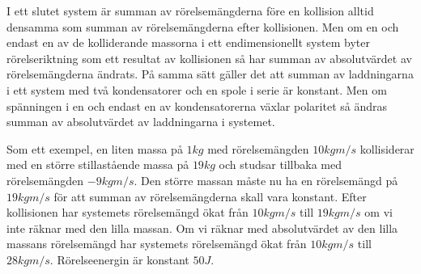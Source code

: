 \documentclass[]{elementary-physics}
\begin{document}
I ett slutet system är summan av rörelsemängderna före en kollision alltid densamma som summan av rörelsemängderna efter kollisionen.
Men om en och endast en av de kolliderande massorna i ett endimensionellt system byter rörelseriktning som ett resultat av kollisionen så har summan av absolutvärdet av rörelsemängderna ändrats.
På samma sätt gäller det att summan av laddningarna i ett  system med två kondensatorer och en spole i serie är konstant.
Men om spänningen i en och endast en av kondensatorerna växlar polaritet så ändras summan av absolutvärdet av laddningarna i systemet.

Som ett exempel, en liten massa på $1 kg$ med rörelsemängden $10 kgm/s$ kollisiderar med en större stillastående massa på $19 kg$ och studsar tillbaka med rörelsemängden $-9 kgm/s$.
Den större massan måste nu ha en rörelsemängd på $19 kgm/s$ för att summan av rörelsemängderna skall vara konstant.
Efter kollisionen har systemets rörelsemängd ökat från $10 kgm/s$ till $19 kgm/s$ om vi inte räknar med den lilla massan.
Om vi räknar med absolutvärdet av den lilla massans rörelsemängd har systemets rörelsemängd ökat från $10 kgm/s$ till $28 kgm/s$.
Rörelseenergin är konstant $50 J$.



\printbibliography
\end{document}
